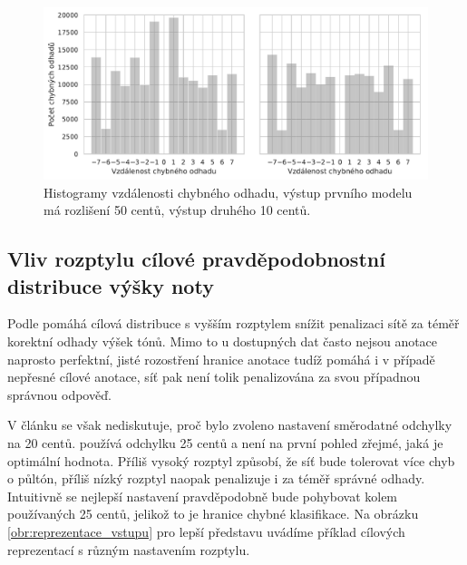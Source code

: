 \begin{figure}[h]\centering
    \includegraphics[scale=0.6]{../img/figures/crepe_diskretizace_hist_grey}
\caption{Histogramy vzdálenosti chybného odhadu, výstup prvního modelu má rozlišení 50 centů, výstup druhého 10 centů.}\label{obr:crepe_diskretizace}
\end{figure}

\subsection{Vliv rozptylu cílové pravděpodobnostní distribuce výšky noty}

Podle \cite{Bittner2017} pomáhá cílová distribuce s vyšším rozptylem snížit penalizaci sítě za téměř korektní odhady výšek tónů. Mimo to u dostupných dat často nejsou anotace naprosto perfektní, jisté rozostření hranice anotace tudíž pomáhá i v případě nepřesné cílové anotace, síť pak není tolik penalizována za svou případnou správnou odpověď. 

V článku se však nediskutuje, proč bylo zvoleno nastavení směrodatné odchylky na 20 centů. \cite{Kim2018} používá odchylku 25 centů a není na první pohled zřejmé, jaká je optimální hodnota. Příliš vysoký rozptyl způsobí, že síť bude tolerovat více chyb o půltón, příliš nízký rozptyl naopak penalizuje i za téměř správné odhady. Intuitivně se nejlepší nastavení pravděpodobně bude pohybovat kolem používaných 25 centů, jelikož to je hranice chybné klasifikace. Na obrázku \ref{obr:reprezentace_vstupu} pro lepší představu uvádíme příklad cílových reprezentací s různým nastavením rozptylu.


